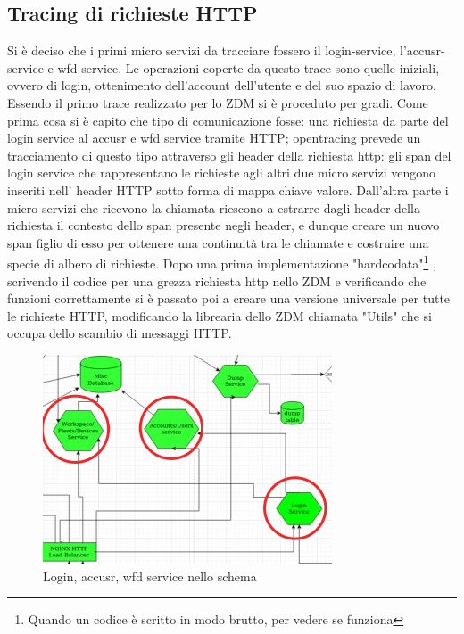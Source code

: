 \documentclass[a4paper,12pt,titlepage,italian,openany]{report}
\begin{document}
\subsection{Tracing di richieste HTTP}
Si è deciso che i primi micro servizi da tracciare fossero il login-service, l'accusr-service e wfd-service. Le operazioni coperte da questo trace sono quelle iniziali, ovvero di login, ottenimento dell'account dell'utente e del suo spazio di lavoro.
Essendo il primo trace realizzato per lo ZDM\cite{zdm:1} si è proceduto per gradi. Come prima cosa si è capito che tipo di comunicazione fosse: una richiesta da parte del login service al accusr e wfd service tramite HTTP;
opentracing prevede un tracciamento di questo tipo attraverso gli header della richiesta http: gli span del login service che rappresentano le richieste agli altri due micro servizi vengono inseriti nell' header HTTP sotto forma di mappa chiave valore.
Dall'altra parte i micro servizi che ricevono la chiamata riescono a estrarre dagli header della richiesta il contesto dello span presente negli header, e dunque creare un nuovo span figlio di esso per ottenere una continuità tra le chiamate e costruire una specie di albero di richieste.
Dopo una prima implementazione "hardcodata"\footnote[1]{Quando un codice è scritto in modo brutto, per vedere se funziona} , scrivendo il codice per una grezza richiesta http nello ZDM\cite{zdm:1} e verificando che funzioni correttamente si è passato poi a creare una versione universale per tutte le richieste HTTP, modificando la librearia dello ZDM\cite{zdm:1} chiamata "Utils" che si occupa dello scambio di messaggi HTTP.
\begin{figure}[H]
    \includegraphics[]{42.png}
    \centering
    \caption{Login, accusr, wfd service nello schema}
\end{figure}
\end{document}
